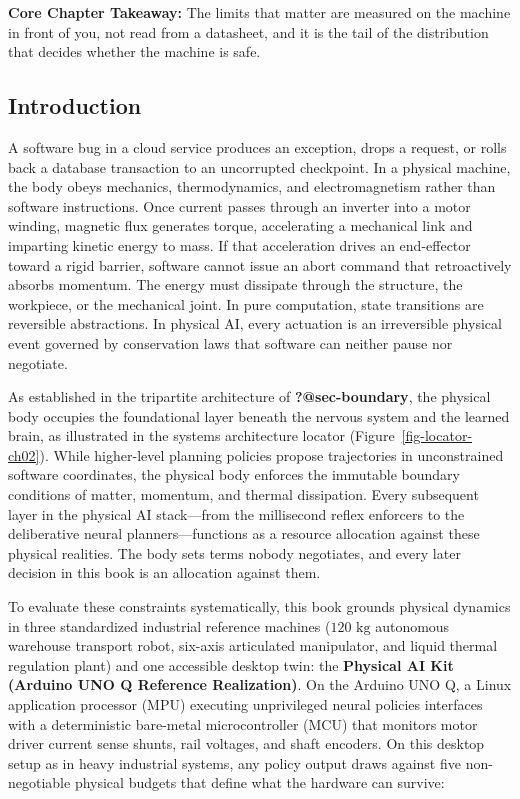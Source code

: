 \documentclass[
  letterpaper,
  DIV=11,
  numbers=noendperiod]{scrartcl}
\begin{document}
\textbf{Core Chapter Takeaway:} The limits that matter are measured on
the machine in front of you, not read from a datasheet, and it is the
tail of the distribution that decides whether the machine is safe.

\subsection{Introduction}\label{sec-body-2-1}

A software bug in a cloud service produces an exception, drops a
request, or rolls back a database transaction to an uncorrupted
checkpoint. In a physical machine, the body obeys mechanics,
thermodynamics, and electromagnetism rather than software instructions.
Once current passes through an inverter into a motor winding, magnetic
flux generates torque, accelerating a mechanical link and imparting
kinetic energy to mass. If that acceleration drives an end-effector
toward a rigid barrier, software cannot issue an abort command that
retroactively absorbs momentum. The energy must dissipate through the
structure, the workpiece, or the mechanical joint. In pure computation,
state transitions are reversible abstractions. In physical AI, every
actuation is an irreversible physical event governed by conservation
laws that software can neither pause nor negotiate.

As established in the tripartite architecture of
\textbf{?@sec-boundary}, the physical body occupies the foundational
layer beneath the nervous system and the learned brain, as illustrated
in the systems architecture locator (Figure~\ref{fig-locator-ch02}).
While higher-level planning policies propose trajectories in
unconstrained software coordinates, the physical body enforces the
immutable boundary conditions of matter, momentum, and thermal
dissipation. Every subsequent layer in the physical AI stack---from the
millisecond reflex enforcers to the deliberative neural
planners---functions as a resource allocation against these physical
realities. The body sets terms nobody negotiates, and every later
decision in this book is an allocation against them.

To evaluate these constraints systematically, this book grounds physical
dynamics in three standardized industrial reference machines
(\(120\text{ kg}\) autonomous warehouse transport robot, six-axis
articulated manipulator, and liquid thermal regulation plant) and one
accessible desktop twin: the \textbf{Physical AI Kit (Arduino UNO Q
Reference Realization)}. On the Arduino UNO Q, a Linux application
processor (MPU) executing unprivileged neural policies interfaces with a
deterministic bare-metal microcontroller (MCU) that monitors motor
driver current sense shunts, rail voltages, and shaft encoders. On this
desktop setup as in heavy industrial systems, any policy output draws
against five non-negotiable physical budgets that define what the
hardware can survive:
\end{document}
